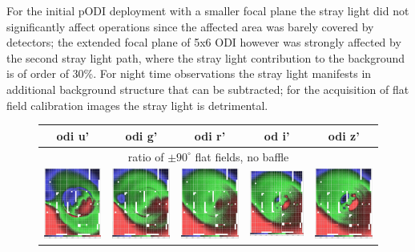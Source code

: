 \documentclass[]{spieman}
\begin{document}
For the initial pODI deployment with a smaller focal plane the stray light did
not significantly affect operations since the affected area was barely covered
by detectors; the extended focal plane of 5x6 ODI however was strongly affected
by the second stray light path, where the stray light contribution to the
background is of order of 30\%. For night time observations the stray light
manifests in additional background structure that can be subtracted; for the
acquisition of flat field calibration images the stray light is detrimental.

	\begin{figure} 
		\centering

		\begin{tabular}{ccccc} odi u' & odi g' & odi r' & od i'
			 & odi z' \\ \hline \multicolumn{5}{c}{ratio of $\pm 90^\circ$ 
				flat
				fields, no baffle} \\[1ex]
			
			\includegraphics[width=0.18\columnwidth]{images/nobaffle_u.jpeg}
			&
			\includegraphics[width=0.18\columnwidth]{images/nobaffle_g.jpeg}
			&
			\includegraphics[width=0.18\columnwidth]{images/nobaffle_r.jpeg}
			&
			\includegraphics[width=0.18\columnwidth]{images/nobaffle_i.jpeg}
			&
			\includegraphics[width=0.18\columnwidth]{images/nobaffle_z.jpeg}
			\\[2ex]
			

\end{tabular}
\end{figure}
\end{document}
